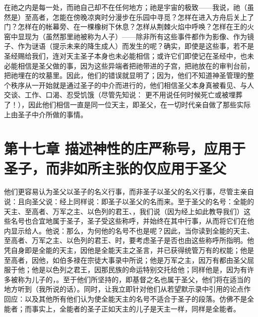 在祂之内是每一处，而祂自己却不在任何地方；祂是宇宙的极致——我说，祂（虽然是）至高者，怎能在傍晚凉爽时分漫步在乐园中寻觅？怎样在进入方舟后关上了门？怎样在的帐幕旁、在一棵橡树下休息？怎样从荆棘火焰中呼唤？怎样在王的火窑中显现为（虽然那里祂被称为人子）——除非所有这些事件都作为影像、作为镜子、作为谜语（提示未来的降生成人）而发生的呢？确实，即使是这些事，若不是圣经赐给我们，连对天主圣子本身也未必能相信；或许它们即使记在圣经中，也未必能相信是圣父做的事，因为这些异端者把祂带进的子宫，把祂放在的审判台前，把祂埋在的坟墓里。因此，他们的错误就显明了；因为，他们不知道神圣管理的整个秩序从一开始就是通过圣子的中介而进行的，他们相信圣父本身真被看见、与人交谈、工作、口渴、忍受饥饿（尽管先知说： 更不用说任何时候死亡或被埋葬了！），因此他们相信一直是同一位天主，即圣父，在一切时代亲自做了那些实际上由圣子中介所做的事情。\par


\section{第十七章 描述神性的庄严称号，应用于圣子，而非如所主张的仅应用于圣父}

他们更容易认为圣父以圣子的名义行事，而非圣子以圣父的名义行事，尽管主亲自说：且向圣父说：经上同样说：即圣子以圣父的名而来。至于圣父的名号：全能的天主、至高者、万军之主、以色列的君王、，我们说（因为经上如此教导我们）这些名号也合宜地属于圣子，圣子受这些称呼，并始终在其中行事，从而将它们在他内显示给人。他说：那么，为何他的名号不也是呢？因此，当你读到全能的天主、至高者、万军之主、以色列的君王、时，要考虑圣子是否也由这些称呼所指明。他凭自身即是全能的天主，因他是全能天主之圣言，并已获得统管万有的权能；他是至高者，因他，如伯多禄在宗徒大事录中所说；他是万军之主，因万有都由圣父屈服于他；他是以色列之君王，因那民族的命运特别交托给他；同样他是，因为有许多被称为儿子的，。至于他们所坚持的，即基督之名也属于圣父，他们将在适当的地方听到（我所说的话）。同时，让我立即针对他们从若望默示录中引用的论点作回应：以及其他所有他们认为使全能天主的名号不适合于圣子的段落。仿佛不是全能者；而事实上，全能者的圣子正如天主的儿子是天主一样，同样是全能者。\par

